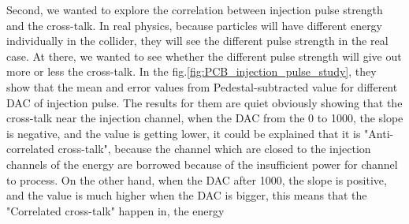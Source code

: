 Second, we wanted to explore the correlation between injection pulse strength and the cross-talk. In real physics, because particles will have different energy individually in the collider, they will see the different pulse strength in the real case. At there, we wanted to see whether the different pulse strength will give out more or less the cross-talk. In the fig.\ref{fig:PCB_injection_pulse_study}, they show that the mean and error values from Pedestal-subtracted value for different DAC of injection pulse. The results for them are quiet obviously showing that the cross-talk near the injection channel, when the DAC from the 0 to 1000, the slope is negative, and the value is getting lower, it could be explained that it is "Anti-correlated cross-talk", because the channel which are closed to the injection channels of the energy are borrowed because of the insufficient power for channel to process. On the other hand, when the DAC after 1000, the slope is positive, and the value is much higher when the DAC is bigger, this means that the "Correlated cross-talk" happen in, the energy 

